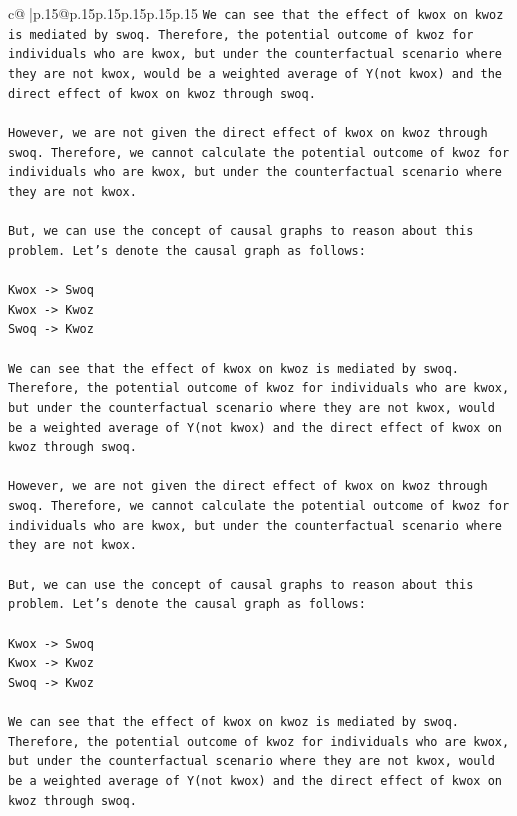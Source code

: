 \documentclass{article}
\begin{document}
{\begin{supertabular}{c@{$\;$}|p{.15\linewidth}@{}p{.15\linewidth}p{.15\linewidth}p{.15\linewidth}p{.15\linewidth}p{.15\linewidth}}
{{{\texttt{We can see that the effect of kwox on kwoz is mediated by swoq. Therefore, the potential outcome of kwoz for individuals who are kwox, but under the counterfactual scenario where they are not kwox, would be a weighted average of Y(not kwox) and the direct effect of kwox on kwoz through swoq.} \\
\\ 
\texttt{However, we are not given the direct effect of kwox on kwoz through swoq. Therefore, we cannot calculate the potential outcome of kwoz for individuals who are kwox, but under the counterfactual scenario where they are not kwox.} \\
\\ 
\texttt{But, we can use the concept of causal graphs to reason about this problem. Let's denote the causal graph as follows:} \\
\\ 
\texttt{Kwox {-}> Swoq} \\
\texttt{Kwox {-}> Kwoz} \\
\texttt{Swoq {-}> Kwoz} \\
\\ 
\texttt{We can see that the effect of kwox on kwoz is mediated by swoq. Therefore, the potential outcome of kwoz for individuals who are kwox, but under the counterfactual scenario where they are not kwox, would be a weighted average of Y(not kwox) and the direct effect of kwox on kwoz through swoq.} \\
\\ 
\texttt{However, we are not given the direct effect of kwox on kwoz through swoq. Therefore, we cannot calculate the potential outcome of kwoz for individuals who are kwox, but under the counterfactual scenario where they are not kwox.} \\
\\ 
\texttt{But, we can use the concept of causal graphs to reason about this problem. Let's denote the causal graph as follows:} \\
\\ 
\texttt{Kwox {-}> Swoq} \\
\texttt{Kwox {-}> Kwoz} \\
\texttt{Swoq {-}> Kwoz} \\
\\ 
\texttt{We can see that the effect of kwox on kwoz is mediated by swoq. Therefore, the potential outcome of kwoz for individuals who are kwox, but under the counterfactual scenario where they are not kwox, would be a weighted average of Y(not kwox) and the direct effect of kwox on kwoz through swoq.} \\
}}}
\end{supertabular}}
\end{document}
